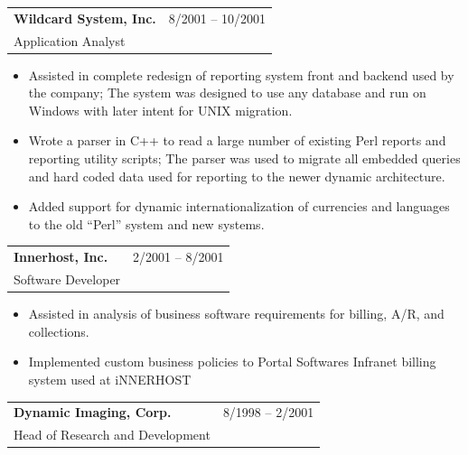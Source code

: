 \documentclass[10pt]{report}
\begin{document}
\noindent
\begin{tabular}{ L{.5\textwidth}  R{.4\textwidth} }
\textbf{\large Wildcard System, Inc.} & 8/2001 -- 10/2001 \\
Application Analyst
\end{tabular}

\begin{itemize}
\item Assisted in complete redesign of reporting system front and backend used by the company; The system was designed to use any database and run on Windows with later intent for UNIX migration.
\item Wrote a parser in C++ to read a large number of existing Perl reports and reporting utility scripts; The parser was used to migrate all embedded queries and hard coded data used for reporting to the newer dynamic architecture.
\item Added support for dynamic internationalization of currencies and languages to the old “Perl” system and new systems.
\end{itemize}
\bigskip

\noindent
\begin{tabular}{ L{.5\textwidth}  R{.4\textwidth} }
\textbf{\large Innerhost, Inc.} & 2/2001 -- 8/2001 \\
Software Developer
\end{tabular}

\begin{itemize}
\item Assisted in analysis of business software requirements for billing, A/R, and collections.
\item Implemented custom business policies to Portal Software\textquotesingle s Infranet billing system used at iNNERHOST
\end{itemize}
\bigskip


\noindent
\begin{tabular}{ L{.5\textwidth}  R{.4\textwidth} }
\textbf{\large Dynamic Imaging, Corp.}  & 8/1998 -- 2/2001 \\
Head of Research and Development &
\end{tabular}
\end{document}
